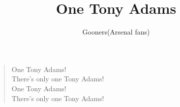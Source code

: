 \documentclass[a4paper,12pt]{article}
\title{One Tony Adams}
\author{Gooners(Arsenal fans)}
\date{}
\begin{document}
	
	\maketitle
	
	\begin{verse}
		
		One Tony Adams! \\
		There's only one Tony Adams! \\
		One Tony Adams! \\
		There's only one Tony Adams!
		
	\end{verse}
	
\end{document}
